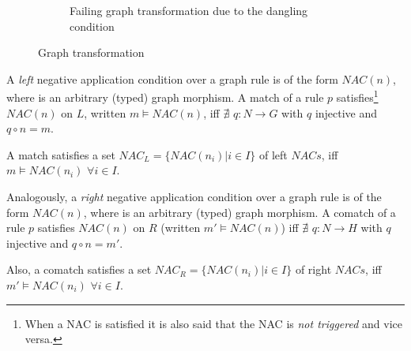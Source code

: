 \begin{example}
\begin{figure}[!ht]
  \begin{subfigure}[t]{.5\textwidth}
    \centerline{}
    \caption{Failing graph transformation due to the dangling condition}\label{fig:gts:transformation-fail}
  \end{subfigure}
  \caption{Graph transformation}\label{fig:gts:transformation}
\end{figure}

\end{example}
\begin{definition} A \emph{left} negative application condition over a graph rule \graphrule{} is of the form $NAC\left(n\right)$, where \nac{} is an arbitrary (typed) graph morphism. A match \match{} of a rule $p$ satisfies\footnote{When a NAC is satisfied it is also said that the NAC is \emph{not triggered} and vice versa.} $NAC\left(n\right)$ on $L$, written $m \models NAC\left(n\right)$, iff $\nexists$ $q : N \rightarrow G$ with $q$ injective and $q \circ n = m$.


  A match \match{} satisfies a set \mbox{$NAC_L = \{NAC\left(n_i\right)|i \in I\}$} of left $NACs$, iff \mbox{$m \models NAC\left(n_i\right)$} $\forall i \in I$.

  Analogously, a \emph{right} negative application condition over a graph rule \graphrule{} is of the form $NAC\left(n\right)$, where \rightnac{} is an arbitrary (typed) graph morphism. A comatch \comatch{} of a rule $p$ satisfies $NAC\left(n\right)$ on $R$ (written \mbox{$m' \models NAC\left(n\right)$}) iff $\nexists$ $q : N \rightarrow H$ with $q$ injective and $q \circ n = m'$.

  Also, a comatch \comatch{} satisfies a set \mbox{$NAC_R = \{NAC\left(n_i\right)|i \in I\}$} of right $NACs$, iff $m' \models NAC\left(n_i\right)$ $\forall i \in I$.

\end{definition}

